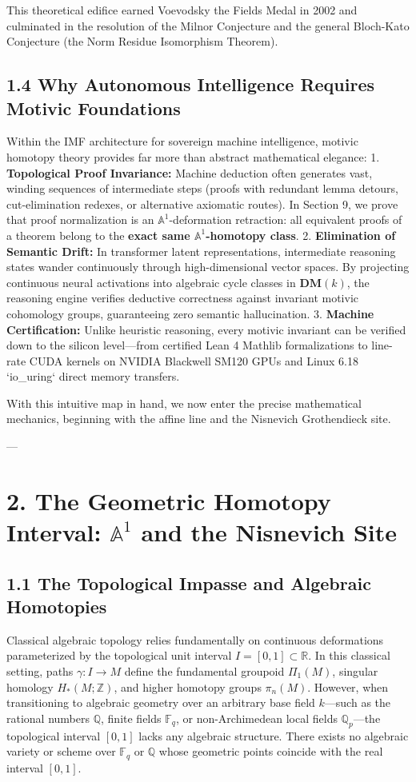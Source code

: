 \documentclass[11pt,twoside,openright]{amsbook}
\begin{document}
{This theoretical edifice earned Voevodsky the Fields Medal in 2002 and culminated in the resolution of the Milnor Conjecture and the general Bloch-Kato Conjecture (the Norm Residue Isomorphism Theorem).

\subsection{1.4 Why Autonomous Intelligence Requires Motivic Foundations}
Within the IMF architecture for sovereign machine intelligence, motivic homotopy theory provides far more than abstract mathematical elegance:
1. \textbf{Topological Proof Invariance:} Machine deduction often generates vast, winding sequences of intermediate steps (proofs with redundant lemma detours, cut-elimination redexes, or alternative axiomatic routes). In Section 9, we prove that proof normalization is an $\mathbb{A}^1$-deformation retraction: all equivalent proofs of a theorem belong to the \textbf{exact same $\mathbb{A}^1$-homotopy class}.
2. \textbf{Elimination of Semantic Drift:} In transformer latent representations, intermediate reasoning states wander continuously through high-dimensional vector spaces. By projecting continuous neural activations into algebraic cycle classes in $\mathbf{DM}(k)$, the reasoning engine verifies deductive correctness against invariant motivic cohomology groups, guaranteeing zero semantic hallucination.
3. \textbf{Machine Certification:} Unlike heuristic reasoning, every motivic invariant can be verified down to the silicon level—from certified Lean 4 Mathlib formalizations to line-rate CUDA kernels on NVIDIA Blackwell SM120 GPUs and Linux 6.18 `io_uring` direct memory transfers.

With this intuitive map in hand, we now enter the precise mathematical mechanics, beginning with the affine line and the Nisnevich Grothendieck site.

---

\section{2. The Geometric Homotopy Interval: $\mathbb{A}^1$ and the Nisnevich Site}

\subsection{1.1 The Topological Impasse and Algebraic Homotopies}
Classical algebraic topology relies fundamentally on continuous deformations parameterized by the topological unit interval $I = [0, 1] \subset \mathbb{R}$. In this classical setting, paths $\gamma: I \to M$ define the fundamental groupoid $\Pi_1(M)$, singular homology $H_*(M; \mathbb{Z})$, and higher homotopy groups $\pi_n(M)$. However, when transitioning to algebraic geometry over an arbitrary base field $k$—such as the rational numbers $\mathbb{Q}$, finite fields $\mathbb{F}_q$, or non-Archimedean local fields $\mathbb{Q}_p$—the topological interval $[0, 1]$ lacks any algebraic structure. There exists no algebraic variety or scheme over $\mathbb{F}_q$ or $\mathbb{Q}$ whose geometric points coincide with the real interval $[0, 1]$.

}
\end{document}
